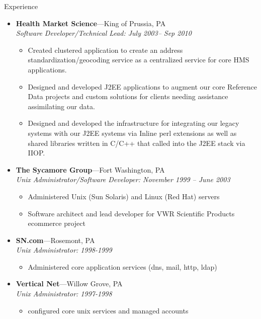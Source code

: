 \documentclass[11pt,oneside]{article}
\newenvironment{ressection}[1]{
        \vspace{4pt}
        {\fontfamily{phv}\selectfont\Large#1}
        \begin{itemize}
        \vspace{3pt}
}{
        \end{itemize}
}
\newcommand{\ressubitem}[1]{
        \vspace{-1pt}
        \item \begin{flushleft} #1 \end{flushleft}
}
\newcommand{\resbigitem}[3]{
        \vspace{-5pt}
        \item
        \textbf{#1}---#2 \\
        \textit{#3}
}
\newenvironment{ressubsec}[3]{
        \resbigitem{#1}{#2}{#3}
        \vspace{-2pt}
        \begin{itemize}
}{
        \end{itemize}
}
\begin{document}
\begin{ressection}{Experience}
\begin{ressubsec}{Health Market Science}{King of Prussia, PA}{Software Developer/Technical Lead: July 2003-- Sep 2010}
          \ressubitem{Created clustered application to create an
            address standardization/geocoding service as a centralized
            service for core HMS applications.}
          \ressubitem{Designed and developed J2EE applications to
            augment our core Reference Data projects and custom
            solutions for clients needing assistance assimilating our
            data.}

          \ressubitem{Designed and developed the infrastructure for
            integrating our legacy systems with our J2EE systems via
            Inline perl extensions as well as shared libraries written
            in C/C++ that called into the J2EE stack via IIOP.}

        \end{ressubsec}

        \begin{ressubsec}{The Sycamore Group}{Fort Washington, PA}{Unix Administrator/Software Developer: November 1999 -- June 2003}

          \ressubitem{Administered Unix (Sun Solaris) and Linux (Red Hat) servers}
          
          \ressubitem{Software architect and lead developer
            for VWR Scientific Products ecommerce project }


        \end{ressubsec}

        \begin{ressubsec}{SN.com}{Rosemont, PA}{Unix Administrator: 1998-1999}
          \ressubitem{Administered core application services (dns, mail, http, ldap)}
        \end{ressubsec}

        \begin{ressubsec}{Vertical Net}{Willow Grove, PA}{Unix Administrator: 1997-1998}
          \ressubitem{configured core unix services and managed accounts}
        \end{ressubsec}

\end{ressection}
\end{document}
